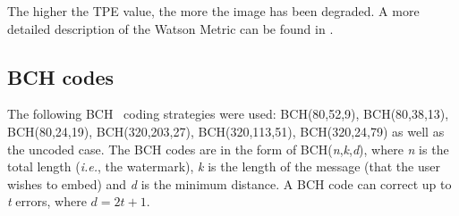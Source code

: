 \documentclass[10pt,twocolumn]{article}
\begin{document}
The higher the TPE value, the more the image has been degraded.
A more detailed 
description of the Watson Metric can be found in \cite{watson2Pap, volo2nd}.

\subsection{BCH codes}
The following BCH~\cite{BKX:bchPlessBk} 
coding strategies were used:
BCH(80,52,9), BCH(80,38,13), BCH(80,24,19), 
BCH(320,203,27), BCH(320,113,51), BCH(320,24,79)
as well as the uncoded case. The BCH codes are in the form of BCH(\emph{n},\emph{k},\emph{d}),
where \emph{n} is the total length (\emph{i.e.}, the watermark), \emph{k} is the length of the message (that the user wishes to embed) 
and \emph{d} is the minimum distance. A BCH code can correct up to \emph{t} errors, where $d = 2t + 1$.
\end{document}
